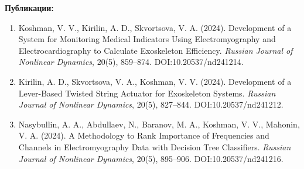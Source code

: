 \textbf{Публикации:}
\begin{enumerate}
\item Koshman, V. V., Kirilin, A. D., Skvortsova, V. A. (2024). Development of a System for Monitoring Medical Indicators Using Electromyography and Electrocardiography to Calculate Exoskeleton Efficiency. \textit{Russian Journal of Nonlinear Dynamics}, 20(5), 859–874. DOI:10.20537/nd241214.
\item Kirilin, A. D., Skvortsova, V. A., Koshman, V. V. (2024). Development of a Lever-Based Twisted String Actuator for Exoskeleton Systems. \textit{Russian Journal of Nonlinear Dynamics}, 20(5), 827–844. DOI:10.20537/nd241212.
\item Nasybullin, A. A., Abdullaev, N., Baranov, M. A., Koshman, V. V., Mahonin, V. A. (2024). A Methodology to Rank Importance of Frequencies and Channels in Electromyography Data with Decision Tree Classifiers. \textit{Russian Journal of Nonlinear Dynamics}, 20(5), 895–906. DOI:10.20537/nd241216.
\end{enumerate}
